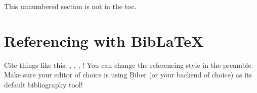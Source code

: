 \documentclass[12pt, letterpaper]{article} %
\begin{document}
This unnumbered section is not in the toc.

\clearpage

\section{Referencing with BibLaTeX}

Cite things like this: \cite{dirac}, \cite{einstein}, \cite{knuth-fa}, \cite{knuthwebsite}! You can change the referencing style in the preamble. Make sure your editor of choice is using Biber (or your backend of choice) as its default bibliography tool!

\printbibliography
\end{document}
